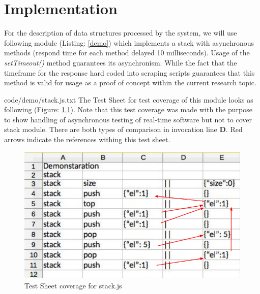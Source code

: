 \chapter{Implementation}
\label{chap:implementation}
For the description of data structures processed by the system, we will use following module (Listing: \ref{demo}) which implements a stack with asynchronous methods (respond time for each method delayed 10 milliseconds). Usage of the \textit{setTimeout()} method guarantees its asynchronism. While the fact that the timeframe for the response hard coded into scraping scripts guarantees that this method is valid for usage as a proof of concept within the current research topic.

{code/demo/stack.js.txt}
The Test Sheet for test coverage of this module looks as following (Figure: \ref{fig:demoTS}). Note that this test coverage was made with the  purpose to show handling of asynchronous testing of real-time software but not to cover stack module. There are both types of comparison in invocation line \textbf{D}. Red arrows indicate the references withing this test sheet.
\begin{figure}[H]
\centering
\includegraphics[width=\linewidth]{grafiken/demoTS.pdf}
\caption{Test Sheet coverage for stack.js}
\label{fig:demoTS}
\end{figure}


